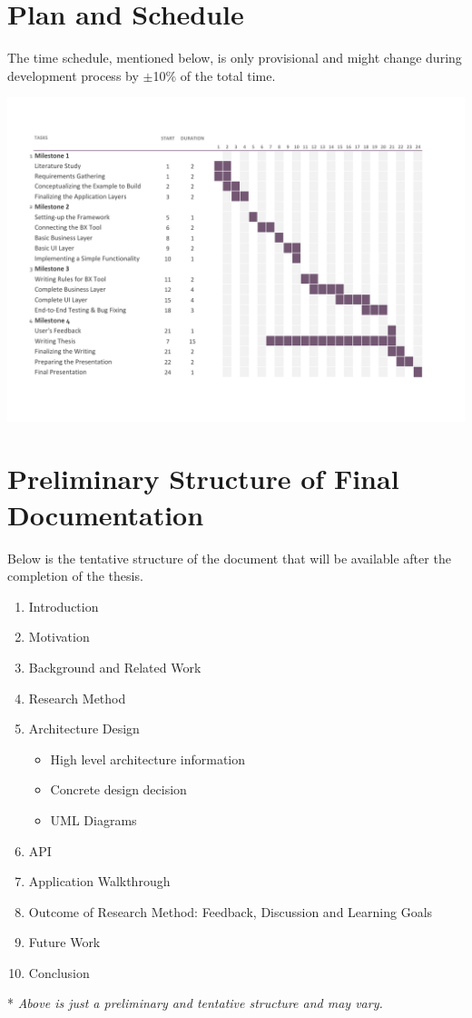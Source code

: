 \section{Plan and Schedule}\label{sec:timeplan}
The time schedule, mentioned below, is only provisional and might change
during development process by {$\pm$}10\% of the total time.

\begin{center}
\includegraphics[width=1.1\textwidth]{figures/Time_Plan}
\label{fig:time_plan}
\end{center}

\section{Preliminary Structure of Final Documentation}\label{sec:finaldocument}
Below is the tentative structure of the document that will be available after the completion of the thesis.
\begin{enumerate}
	\item {Introduction}
	\item {Motivation}
	\item {Background and Related Work}
	\item {Research Method}
	\item {Architecture Design}
	\begin{itemize}
	    \item {High level architecture information}	
	    \item {Concrete design decision}
	    \item {UML Diagrams}
	\end{itemize}
	\item {API}
	\item {Application Walkthrough}
	\item {Outcome of Research Method: Feedback, Discussion and Learning Goals}
	\item {Future Work}
	\item {Conclusion}
\end{enumerate} 
* \textit{Above is just a preliminary and tentative structure and may vary.}

